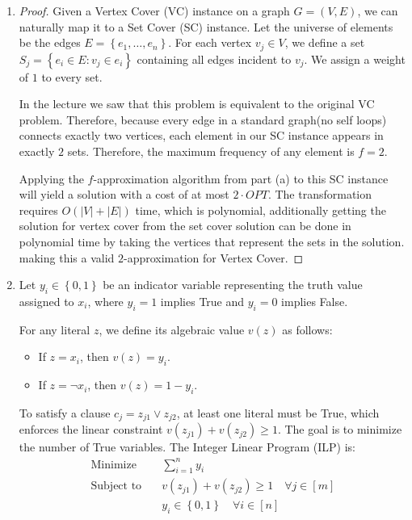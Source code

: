 \begin{enumerate}[label=(\alph*), leftmargin=*, align=left]
    \item 
    \begin{proof}
        Given a Vertex Cover (VC) instance on a graph $G = (V, E)$, we can naturally map it to a Set Cover (SC) instance. Let the universe of elements be the edges $E = \left\{ e_1, \dots, e_n \right\}$. For each vertex $v_j \in V$, we define a set $S_j = \left\{ e_i \in E : v_j \in e_i \right\}$ containing all edges incident to $v_j$. We assign a weight of $1$ to every set. 

        In the lecture we saw that
        this problem is equivalent to the original VC problem.
        Therefore, because every edge in a standard graph(no self loops) connects exactly two vertices, each element in our SC instance appears in exactly $2$ sets. Therefore, the maximum frequency of any element is $f = 2$.
        
        Applying the $f$-approximation algorithm from part (a) to this SC instance will yield a solution with a cost of at most $2 \cdot OPT$. The transformation requires $O(|V| + |E|)$ time, which is polynomial, additionally getting the solution for vertex cover from the set cover solution can be done in polynomial time by taking the vertices that represent the sets in the solution. making this a valid $2$-approximation for Vertex Cover.
    \end{proof}

    \item Let $y_i \in \left\{ 0, 1 \right\}$ be an indicator variable representing the truth value assigned to $x_i$, where $y_i = 1$ implies True and $y_i = 0$ implies False. 
    
    For any literal $z$, we define its algebraic value $v(z)$ as follows:
    \begin{itemize}
        \item If $z = x_i$, then $v(z) = y_i$.
        \item If $z = \neg x_i$, then $v(z) = 1 - y_i$.
    \end{itemize}
    To satisfy a clause $c_j = z_{j1} \vee z_{j2}$, at least one literal must be True, which enforces the linear constraint $v(z_{j1}) + v(z_{j2}) \ge 1$. The goal is to minimize the number of True variables. The Integer Linear Program (ILP) is:
    \begin{align*}
        \text{Minimize} \quad & \sum_{i=1}^{n} y_i \\
        \text{Subject to} \quad & v(z_{j1}) + v(z_{j2}) \ge 1 \quad \forall j \in [m] \\
        & y_i \in \left\{ 0, 1 \right\} \quad \forall i \in [n]
    \end{align*}


\end{enumerate}
